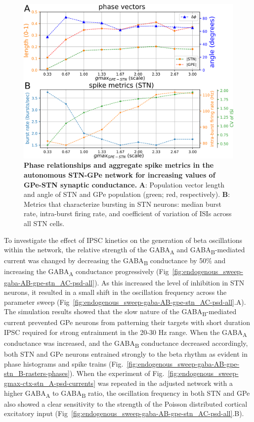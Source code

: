 \begin{figure}
\centering
\includegraphics[width=\textwidth]{ch_detailed_model/figs_split/fig_endogenous_sweep-gmax-gpe-stn_C-metrics.png}
\caption{
\textbf{Phase relationships and aggregate spike metrics in the autonomous STN-GPe network for increasing values of GPe-STN synaptic conductance.}
\textbf{A}: Population vector length and angle of STN and GPe population (green; red, respectively).
\textbf{B}: Metrics that characterize bursting in STN neurons: median burst rate, intra-burst firing rate, and coefficient of variation of ISIs across all STN cells.
}
\label{fig:endogenous_sweep-gmax-gpe-stn_C-metrics}
\end{figure}

%
%
%
%

%

%

%
To investigate the effect of IPSC kinetics on the generation of beta oscillations within the network, the relative strength of the GABA\textsubscript{A} and GABA\textsubscript{B}-mediated current was changed by decreasing the GABA\textsubscript{B} conductance by 50\% and increasing the GABA\textsubscript{A} conductance progressively (Fig~\ref{fig:endogenous_sweep-gaba-AB-gpe-stn_AC-psd-all}). As this increased the level of inhibition in STN neurons, it resulted in a small shift in the oscillation frequency across the parameter sweep (Fig~\ref{fig:endogenous_sweep-gaba-AB-gpe-stn_AC-psd-all}.A).
%
The simulation results showed that the slow nature of the GABA\textsubscript{B}-mediated current prevented GPe neurons from patterning their targets with short duration IPSC required for strong entrainment in the 20-30 Hz range. When the GABA\textsubscript{A} conductance was increased, and the GABA\textsubscript{B} conductance decreased accordingly, both STN and GPe neurons entrained strongly to the beta rhythm as evident in phase histograms and spike trains (Fig.~\ref{fig:endogenous_sweep-gaba-AB-gpe-stn_B-rasters-phases}). When the experiment of Fig.~\ref{fig:endogenous_sweep-gmax-ctx-stn_A-psd-currents} was repeated in the adjusted network with a higher GABA\textsubscript{A} to GABA\textsubscript{B} ratio, the oscillation frequency in both STN and GPe also showed a clear sensitivity to the strength of the Poisson distributed cortical excitatory input (Fig~\ref{fig:endogenous_sweep-gaba-AB-gpe-stn_AC-psd-all}.B).

